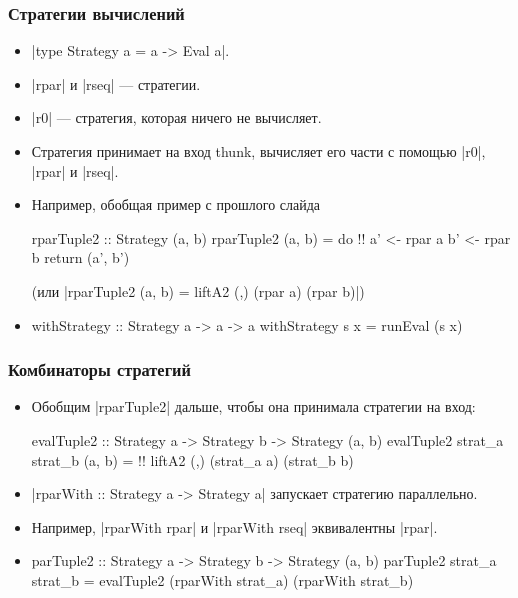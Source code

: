 \documentclass[11pt]{beamer}
\begin{document}
\begin{frame}[fragile]
  \frametitle{Стратегии вычислений}
  \begin{itemize}
    \item \haskinline|type Strategy a = a -> Eval a|.
    \item \haskinline|rpar| и \haskinline|rseq| --- стратегии.
    \item \haskinline|r0| --- стратегия, которая ничего не вычисляет.
    \item Стратегия принимает на вход thunk, вычисляет его части с помощью \haskinline|r0|, \haskinline|rpar| и \haskinline|rseq|.
    \item Например, обобщая пример с прошлого слайда
          \begin{haskell}
            rparTuple2 :: Strategy (a, b)
            rparTuple2 (a, b) = do !\pause!
              a' <- rpar a
              b' <- rpar b
              return (a', b')
          \end{haskell}
          \pause
          (или \haskinline[fontsize=\small]|rparTuple2 (a, b) = liftA2 (,) (rpar a) (rpar b)|)
    \item
          \begin{haskell}
withStrategy :: Strategy a -> a -> a
withStrategy s x = runEval (s x)
\end{haskell}
  \end{itemize}
\end{frame}

\begin{frame}[fragile]
  \frametitle{Комбинаторы стратегий}
  \begin{itemize}
    \item Обобщим \haskinline|rparTuple2| дальше, чтобы она принимала стратегии на вход:
          \begin{haskell}
            evalTuple2 :: Strategy a -> Strategy b -> 
              Strategy (a, b)
            evalTuple2 strat_a strat_b (a, b) = !\pause! 
              liftA2 (,) (strat_a a) (strat_b b)
          \end{haskell}
          \pause
    \item \haskinline|rparWith :: Strategy a -> Strategy a| запускает стратегию параллельно.
    \item Например, \haskinline|rparWith rpar| и \haskinline|rparWith rseq| эквивалентны \haskinline|rpar|.
          \pause
    \item
          \begin{haskell}
            parTuple2 :: Strategy a -> Strategy b -> 
              Strategy (a, b)
            parTuple2 strat_a strat_b = 
              evalTuple2 (rparWith strat_a) (rparWith strat_b)
          \end{haskell}
  \end{itemize}
\end{frame}
\end{document}

